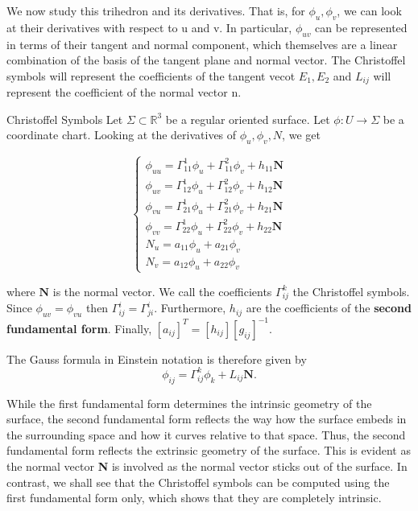 \documentclass[twoside]{article}
\begin{document}
We now study this trihedron and its derivatives. That is, for $\phi_u, \phi_v$, we can look at their derivatives with respect to u and v. In particular, $\phi_{uv}$ can be represented in terms of their tangent and normal component, which themselves are a linear combination of the basis of the tangent plane and normal vector. The Christoffel symbols will represent the coefficients of the tangent vecot $E_1, E_2$ and $L_{ij}$ will represent the coefficient of the normal vector n.


\begin{definition_exam}{Christoffel Symbols}{} Let $\Sigma \subset \mathbb{R}^3$ be a regular oriented surface. Let $\phi: U \rightarrow \Sigma$ be a coordinate chart. Looking at the derivatives of $\phi_u, \phi_v, N$, we get 

$$
\begin{cases}
\phi_{uu} = \Gamma_{11}^{1}\phi_u + \Gamma_{11}^{2}\phi_v + h_{11}\textbf{N} \\
\phi_{uv} = \Gamma_{12}^{1}\phi_u + \Gamma_{12}^{2}\phi_v + h_{12}\textbf{N} \\
\phi_{vu} = \Gamma_{21}^{1}\phi_u + \Gamma_{21}^{2}\phi_v + h_{21}\textbf{N} \\
\phi_{vv} = \Gamma_{22}^{1}\phi_u + \Gamma_{22}^{2}\phi_v + h_{22}\textbf{N} \\
N_{u} = a_{11}\phi_u + a_{21}\phi_v \\
N_{v} = a_{12}\phi_u + a_{22}\phi_v
\end{cases}
$$

where $\textbf{N}$ is the normal vector. We call the coefficients $\Gamma_{ij}^{k}$ the Christoffel symbols. Since $\phi_{uv} = \phi_{vu}$ then $\Gamma_{ij}^{i} = \Gamma_{ji}^{i}$. Furthermore, $h_{ij}$ are the coefficients of the \textbf{second fundamental form}. Finally, $[a_{ij}]^T = [h_{ij}][g_{ij}]^{-1}.$
\end{definition_exam}

The Gauss formula in Einstein notation is therefore given by 
$$
\phi_{ij} = \Gamma_{ij}^{k}\phi_{k} + L_{ij}\textbf{N}.
$$

While the first fundamental form determines the intrinsic geometry of the surface, the second fundamental form reflects the way how the surface embeds in the surrounding space and how it curves relative to that space. Thus, the second fundamental form reflects the extrinsic geometry of the surface. This is evident as the normal vector \textbf{N} is involved as the normal vector sticks out of the surface. In contrast, we shall see that the Christoffel symbols can be computed using the first fundamental form only, which shows that they are completely intrinsic.
\end{document}
